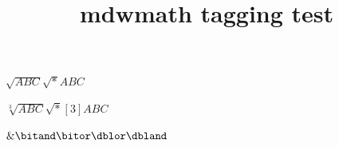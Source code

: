 \documentclass{article}
\title{mdwmath tagging test}
\begin{document}
$\sqrt{ABC}\sqrt*{ABC}$

$\sqrt[3]{ABC}\sqrt*[3]{ABC}$

$\&\bitand\bitor\dblor\dbland$

\end{document}
